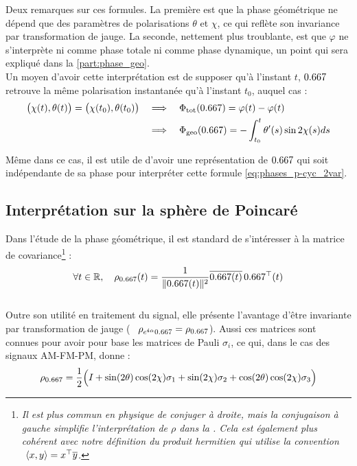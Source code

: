 Deux remarques sur ces formules. 
La première est que la phase géométrique ne dépend que des paramètres de polarisations $\theta$ et $\chi$, ce qui reflète son invariance par transformation de jauge.
La seconde, nettement plus troublante, est que $\varphi$ ne s'interprète ni comme phase totale ni comme phase dynamique, un point qui sera expliqué dans la \cref{part:phase_geo}.
\\
Un moyen d'avoir cette interprétation est de supposer qu'à l'instant $t$, $\x $ retrouve la même polarisation instantanée qu'à l'instant $t_0$, auquel cas :
\begin{equation}\label{eq:phases_p-cyc_2var}
	\begin{aligned}
		\big( \chi(t), \theta(t) \big) = \big( \chi(t_0), \theta(t_0) \big)\quad 
		&\Lr\quad \phaset(\x ) = \varphi(t) - \varphi(t) \\
		&\Lr\quad \phaseg(\x ) = -\int_{t_0}^t \theta'(s) \sin 2\chi(s) ds
	\end{aligned}
\end{equation}
\skipl

Même dans ce cas, il est utile de d'avoir une représentation de $\x $ qui soit indépendante de sa phase pour interpréter cette formule \eqref{eq:phases_p-cyc_2var}.
\\



\subsection{Interprétation sur la sphère de Poincaré}\label{subsec:phase_g2Poincare}

Dans l'étude de la phase géométrique, il est standard de s'intéresser à la matrice de covariance\footnote{\itshape
	Il est plus commun en physique de conjuger à droite, mais la conjugaison à gauche simplifie l'interprétation de $\rho$ dans la . Cela est également plus cohérent avec notre définition du produit hermitien qui utilise la convention $\ \langle x, y\rangle = \transp{x}\congu{y}$.
} :
\begin{equation} \label{eq:proj2x_2var}
	\forall t\in\R,\quad \rho_{\x}(t) = \frac{1}{\|\x(t) \|^2} \congu{\x(t) }\, \transp{\x}(t)
\end{equation}
\\
Outre son utilité en traitement du signal, elle présente l'avantage d'être invariante par transformation de jauge (\ie~ $\rho_{e^{\i \alpha}\x} = \rho_{\x}$).
Aussi ces matrices sont connues \cite{brosseau} pour avoir pour base les matrices de Pauli $\sigma_i$, ce qui, dans le cas des signaux AM-FM-PM, donne \cite{le_bihan_geometric_2024} :
\begin{equation} \label{eq:decompo_pauli}
	\rho_{\x} = \frac{1}{2}\Big( \Id + \sin(2\theta) \cos(2\chi) \sigma_1 + \sin (2\chi) \sigma_2 + \cos(2\theta) \cos(2\chi) \sigma_3 \Big)
\end{equation}


